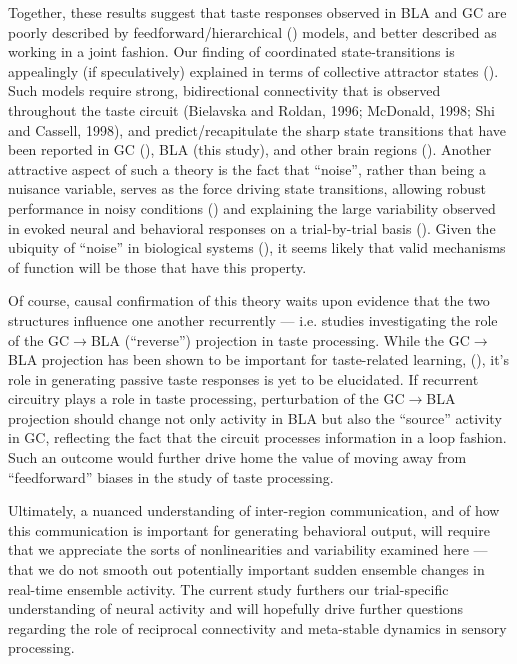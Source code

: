 \begin{refsection}
Together, these results suggest that taste responses observed in BLA and GC are poorly described by feedforward/hierarchical (\cite{parras2017a,glaser2018a,heidari-gorji2021a}) models, and better described as working in a joint fashion. Our finding of coordinated state-transitions is appealingly (if speculatively) explained in terms of collective attractor states (\cite{miller2010a,litwin-kumar2012a,camera2019a,recanatesi2022a}). Such models require strong, bidirectional connectivity that is observed throughout the taste circuit (Bielavska and Roldan, 1996; McDonald, 1998; Shi and Cassell, 1998), and predict/recapitulate the sharp state transitions that have been reported in GC (\cite{jones2007a,sadacca2016a}), BLA (this study), and other brain regions (\cite{seidemann1996a,gat1997a,sugase1999a,latimer2015a}). Another attractive aspect of such a theory is the fact that “noise”, rather than being a nuisance variable, serves as the force driving state transitions, allowing robust performance in noisy conditions (\cite{miller2013a}) and explaining the large variability observed in evoked neural and behavioral responses on a trial-by-trial basis (\cite{kisley1999a,carandini2004a,jones2007a,kotekal2020a,peixoto2021a}). Given the ubiquity of “noise” in biological systems (\cite{shadlen1994a,shadlen1998a,miller2010a}), it seems likely that valid mechanisms of function will be those that have this property. 

Of course, causal confirmation of this theory waits upon evidence that the two structures influence one another recurrently --- i.e. studies investigating the role of the GC$\rightarrow$BLA (“reverse”) projection in taste processing. While the GC$\rightarrow$BLA projection has been shown to be important for taste-related learning, (\cite{lavi2018a,kayyal2019a}), it’s role in generating passive taste responses is yet to be elucidated. If recurrent circuitry plays a role in taste processing, perturbation of the GC$\rightarrow$BLA projection should change not only activity in BLA but also the “source” activity in GC, reflecting the fact that the circuit processes information in a loop fashion. Such an outcome would further drive home the value of moving away from “feedforward” biases in the study of taste processing. 

Ultimately, a nuanced understanding of inter-region communication, and of how this communication is important for generating behavioral output, will require that we appreciate the sorts of nonlinearities and variability examined here --- that we do not smooth out potentially important sudden ensemble changes in real-time ensemble activity. The current study furthers our trial-specific understanding of neural activity and will hopefully drive further questions regarding the role of reciprocal connectivity and meta-stable dynamics in sensory processing.


\end{refsection}

